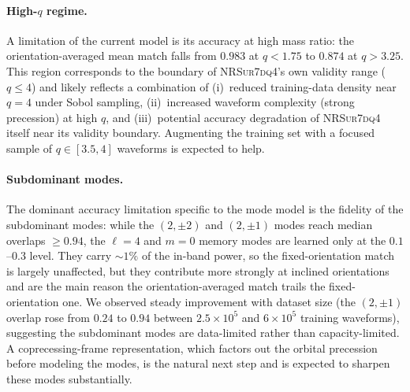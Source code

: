\documentclass[aps,prd,twocolumn,superscriptaddress,longbibliography]{revtex4-2}
\newcommand{\NRSur}{\textsc{NRSur7dq4}}
\begin{document}
\paragraph{High-$q$ regime.}
A limitation of the current model is its accuracy at high mass ratio: the
orientation-averaged mean match falls from $0.983$ at $q<1.75$ to $0.874$ at
$q>3.25$. This region corresponds to the boundary of \NRSur{}'s own validity
range ($q\leq4$) and likely reflects a combination of (i)~reduced training-data
density near $q=4$ under Sobol sampling, (ii)~increased waveform complexity
(strong precession) at high $q$, and (iii)~potential accuracy degradation of
\NRSur{} itself near its validity boundary. Augmenting the training set with a
focused sample of $q\in[3.5,4]$ waveforms is expected to help.

\paragraph{Subdominant modes.}
The dominant accuracy limitation specific to the mode model is the fidelity of
the subdominant modes: while the $(2,\pm2)$ and $(2,\pm1)$ modes reach median
overlaps $\geq0.94$, the $\ell=4$ and $m=0$ memory modes are learned only at the
$0.1$--$0.3$ level. They carry ${\sim}1\%$ of the in-band power, so the
fixed-orientation match is largely unaffected, but they contribute more strongly
at inclined orientations and are the main reason the orientation-averaged match
trails the fixed-orientation one. We observed steady improvement with dataset
size (the $(2,\pm1)$ overlap rose from $0.24$ to $0.94$ between $2.5\times10^5$
and $6\times10^5$ training waveforms), suggesting the subdominant modes are
data-limited rather than capacity-limited. A coprecessing-frame representation,
which factors out the orbital precession before modeling the modes, is the
natural next step and is expected to sharpen these modes substantially.
\end{document}
